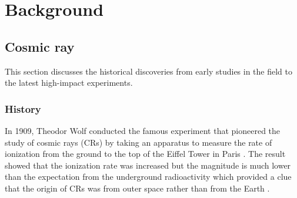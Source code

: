 \chapter{Background}


\section{Cosmic ray}
This section discusses the historical discoveries from early
studies in the field to the latest high-impact experiments. 

\subsection{History}
In 1909, Theodor Wolf conducted the famous experiment that
pioneered the study of cosmic rays (CRs) by taking an apparatus
to measure the rate of ionization from the ground to the top of
the Eiffel Tower in Paris \citep{gray1949cosmic}.
The result showed that the ionization rate was increased
but the magnitude is much lower than the expectation from 
the underground radioactivity which provided a clue
that the origin of CRs was from outer space
rather than from the Earth \citep{EarlyCRGerman}.

